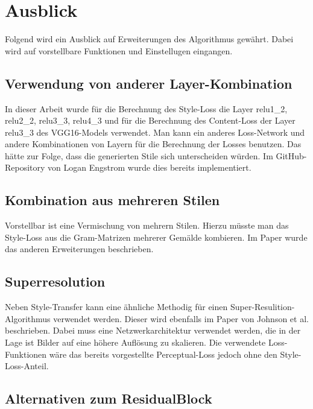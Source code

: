 \section{Ausblick}

Folgend wird ein Ausblick auf Erweiterungen des Algorithmus gewährt. Dabei wird auf vorstellbare Funktionen und Einstellugen eingangen.

\subsection{Verwendung von anderer Layer-Kombination}

In dieser Arbeit wurde für die Berechnung des Style-Loss die Layer relu1\_2, relu2\_2, relu3\_3, relu4\_3 und für die Berechnung des Content-Loss der Layer relu3\_3 des VGG16-Models verwendet. Man kann ein anderes Loss-Network und andere Kombinationen von Layern für die Berechnung der Losses benutzen. Das hätte zur Folge, dass die generierten Stile sich unterscheiden würden. Im GitHub-Repository von Logan Engstrom  \cite{engstrom2016faststyletransfer} wurde dies bereits implementiert.

\subsection{Kombination aus mehreren Stilen}
\label{sec:combination_many_styles}

Vorstellbar ist eine Vermischung von mehrern Stilen. Hierzu müsste man das Style-Loss aus die Gram-Matrizen mehrerer Gemälde kombieren. Im Paper \cite{stanfordStyleTransfer} wurde das anderen Erweiterungen beschrieben.

\subsection{Superresolution}
\label{sec:superresolution}

Neben Style-Transfer kann eine ähnliche Methodig für einen Super-Resulition-Algorithmus verwendet werden. Dieser wird ebenfalls im Paper von Johnson et al. \cite{DBLP:journals/corr/JohnsonAL16} beschrieben. Dabei muss eine Netzwerkarchitektur verwendet werden, die in der Lage ist Bilder auf eine höhere Auflösung zu skalieren. Die verwendete Loss-Funktionen wäre das bereits vorgestellte Perceptual-Loss jedoch ohne den Style-Loss-Anteil.

\subsection{Alternativen zum ResidualBlock}
\label{sec:alternatives_to_residual_block}


